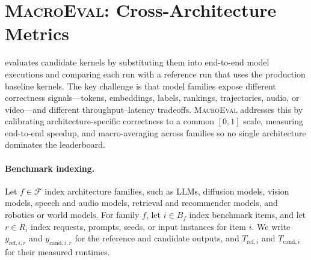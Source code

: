 \section{\textsc{MacroEval}: Cross-Architecture Metrics}
\label{sec:metrics}

\fastkernels{} evaluates candidate kernels by substituting them into end-to-end model executions and comparing each run with a reference run that uses the production baseline kernels.
The key challenge is that model families expose different correctness signals---tokens, embeddings, labels, rankings, trajectories, audio, or video---and different throughput--latency tradeoffs.
\textsc{MacroEval} addresses this by calibrating architecture-specific correctness to a common $[0,1]$ scale, measuring end-to-end speedup, and macro-averaging across families so no single architecture dominates the leaderboard.

\paragraph{Benchmark indexing.}
Let $f \in \mathcal{F}$ index architecture families, such as LLMs, diffusion models, vision models, speech and audio models, retrieval and recommender models, and robotics or world models.
For family $f$, let $i \in B_f$ index benchmark items, and let $r \in R_i$ index requests, prompts, seeds, or input instances for item $i$.
We write $y_{\mathrm{ref},i,r}$ and $y_{\mathrm{cand},i,r}$ for the reference and candidate outputs, and $T_{\mathrm{ref},i}$ and $T_{\mathrm{cand},i}$ for their measured runtimes.

